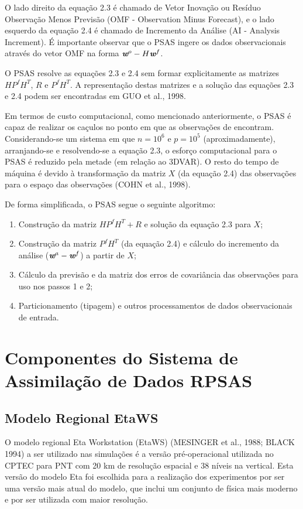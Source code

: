 O lado direito da equação 2.3 é chamado de Vetor Inovação ou Resíduo Observação Menos Previsão (OMF - Observation Minus Forecast), e o lado esquerdo da equação 2.4 é chamado de Incremento da Análise (AI - Analysis Increment). É importante observar que o PSAS ingere os dados observacionais através do vetor OMF na forma $\textit{\textbf{w}}^o-H\textit{\textbf{w}}^f$.

O PSAS resolve as equações 2.3 e 2.4 sem formar explicitamente as matrizes $HP^{f}H^{T}$, $R$ e $P^{f}H^{T}$. A representação destas matrizes e a solução das equações 2.3 e 2.4 podem ser encontradas em GUO et al., 1998.

Em termos de custo computacional, como mencionado anteriormente, o PSAS é capaz de realizar os caçulos no ponto em que as observações de encontram. Considerando-se um sistema em que $n=10^{6}$ e $p=10^{5}$ (aproximadamente), arranjando-se e resolvendo-se a equação 2.3, o esforço computacional para o PSAS é reduzido pela metade (em relação ao 3DVAR). O resto do tempo de máquina é devido à transformação da matriz $X$ (da equação 2.4) das observações para o espaço das observações (COHN et al., 1998).

De forma simplificada, o PSAS segue o seguinte algoritmo:

\begin{enumerate}
\item Construção da matriz $HP^{f}H^{T}+R$ e solução da equação 2.3 para $X$;
\item Construção da matriz $P^{f}H^{T}$ (da equação 2.4) e cálculo do incremento da análise ($\textit{\textbf{w}}^a-\textit{\textbf{w}}^f$) a partir de $X$;
\item Cálculo da previsão e da matriz dos erros de covariância das observações para uso nos passos 1 e 2;
\item Particionamento (tipagem) e outros processamentos de dados observacionais de entrada.
\end{enumerate}

\section{Componentes do Sistema de Assimilação de Dados RPSAS}
\label{ss:compsisassimdados}

\subsection{Modelo Regional EtaWS}

O modelo regional Eta Workstation (EtaWS) (MESINGER et al., 1988; BLACK 1994) a ser utilizado nas simulações é a versão pré-operacional utilizada no CPTEC para PNT com 20 km de resolução espacial e 38 níveis na vertical. Esta versão do modelo Eta foi escolhida para a realização dos experimentos por ser uma versão mais atual do modelo, que inclui um conjunto de física mais moderno e por ser utilizada com maior resolução. 

